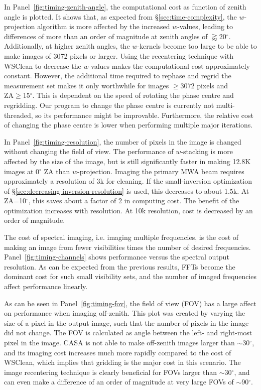 \documentclass[useAMS,usenatbib]{mn2e}
\newcommand{\degree}{\ensuremath{^{\circ}}\xspace}
\begin{document}
In Panel~\ref{fig:timing-zenith-angle}, the computational cost as function of zenith angle is plotted. It shows that, as expected from \S\ref{sec:time-complexity}, the $w$-projection algorithm is more affected by the increased $w$-values, leading to differences of more than an order of magnitude at zenith angles of $\gtrapprox 20$\degree. Additionally, at higher zenith angles, the $w$-kernels become too large to be able to make images of 3072 pixels or larger. Using the recentering technique with WSClean to decrease the $w$-values makes the computational cost approximately constant. However, the additional time required to rephase and regrid the measurement set makes it only worthwhile for images $\ge3072$ pixels and $\textrm{ZA}\ge15\degree$. This is dependent on the speed of rotating the phase centre and regridding. Our program to change the phase centre is currently not multi-threaded, so its performance might be improvable. Furthermore, the relative cost of changing the phase centre is lower when performing multiple major iterations.

In Panel~\ref{fig:timing-resolution}, the number of pixels in the image is changed without changing the field of view. The performance of $w$-stacking is more affected by the size of the image, but is still significantly faster in making 12.8K images at 0\degree ZA than $w$-projection. Imaging the primary MWA beam requires approximately a resolution of 3k for cleaning. If the small-inversion optimization of \S\ref{sec:decreasing-inversion-resolution} is used, this decreases to about 1.5k. At ZA=10\degree, this saves about a factor of 2 in computing cost. The benefit of the optimization increases with resolution. At 10k resolution, cost is decreased by an order of magnitude.

The cost of spectral imaging, i.e. imaging multiple frequencies, is the cost of making an image from fewer visibilities times the number of desired frequencies. Panel~\ref{fig:timing-channels} shows performance versus the spectral output resolution. As can be expected from the previous results, FFTs become the dominant cost for such small visibility sets, and the number of imaged frequencies affect performance linearly.

As can be seen in Panel~\ref{fig:timing-fov}, the field of view (FOV) has a large affect on performance when imaging off-zenith. This plot was created by varying the size of a pixel in the output image, such that the number of pixels in the image did not change. The FOV is calculated as angle between the left- and right-most pixel in the image. CASA is not able to make off-zenith images larger than $\sim$30\degree, and its imaging cost increases much more rapidly compared to the cost of WSClean, which implies that gridding is the major cost in this scenario. The image recentering technique is clearly beneficial for FOVs larger than $\sim$30\degree, and can even make a difference of an order of magnitude at very large FOVs of $\sim$90\degree.
\end{document}
